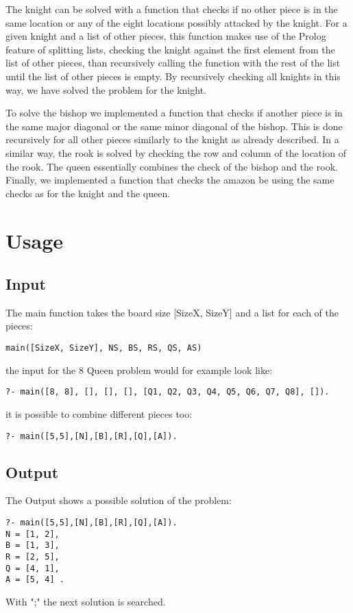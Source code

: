 \documentclass{article}
\begin{document}
The knight can be solved with a function that checks if no other piece is in the same location or any of the eight locations possibly attacked by the knight. For a given knight and a list of other pieces, this function makes use of the Prolog feature of splitting lists, checking the knight against the first element from the list of other pieces, than recursively calling the function with the rest of the list until the list of other pieces is empty. By recursively checking all knights in this way, we have solved the problem for the knight.

To solve the bishop we implemented a function that checks if another piece is in the same major diagonal or the same minor diagonal of the bishop. This is done recursively for all other pieces similarly to the knight as already described. In a similar way, the rook is solved by checking the row and column of the location of the rook. The queen essentially combines the check of the bishop and the rook. Finally, we implemented a function that checks the amazon be using the same checks as for the knight and the queen.

\section{Usage} \label{sec:usage}
\subsection{Input}
The main function takes the board size [SizeX, SizeY] and a list for each of the pieces:
\begin{verbatim}
main([SizeX, SizeY], NS, BS, RS, QS, AS)
\end{verbatim}
the input for the 8 Queen problem would for example look like:
\begin{verbatim}
?- main([8, 8], [], [], [], [Q1, Q2, Q3, Q4, Q5, Q6, Q7, Q8], []).
\end{verbatim}
it is possible to combine different pieces too:
\begin{verbatim}
?- main([5,5],[N],[B],[R],[Q],[A]).
\end{verbatim}

\subsection{Output}
The Output shows a possible solution of the problem:
\begin{verbatim}
?- main([5,5],[N],[B],[R],[Q],[A]).
N = [1, 2],
B = [1, 3],
R = [2, 5],
Q = [4, 1],
A = [5, 4] .
\end{verbatim}
With ";" the next solution is searched.
\end{document}
